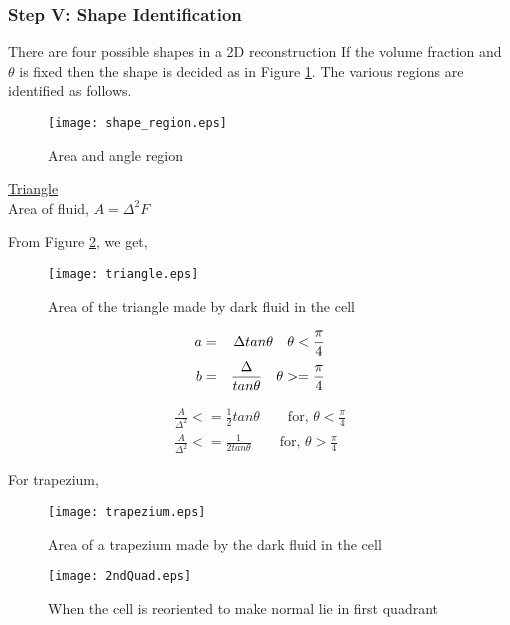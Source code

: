 \subsubsection{Step V: Shape Identification}
There are four possible shapes in a 2D reconstruction 
If the volume fraction and $\theta$ is fixed then the shape is decided as in Figure \ref{Fig:shape_region}. The various regions are identified as follows.
\begin{figure}
 \centering
    \texttt{[image: shape\_region.eps]}
  \caption{Area and angle region}
  \label{Fig:shape_region}
\end{figure}
\underline{Triangle}\\
Area of fluid, $A=\Delta^2F$ 

From Figure \ref{Fig:triangle}, we get,

\begin{figure}%
\centering
\texttt{[image: triangle.eps]}
\caption{Area of the triangle made by dark fluid in the cell}
\label{Fig:triangle}
\end{figure}

\begin{eqnarray*}
 a&=&\Delta tan\theta \text{\quad $\theta < \frac{\pi}{4}$} \\  
 b&=&\frac{\Delta}{tan\theta} \text{\quad $\theta >= \frac{\pi}{4}$}\\
\end{eqnarray*}

\begin{equation*}
\boxed{\begin{align}
    \frac{A}{\Delta^2} <= \frac{1}{2} tan\theta \qquad \text{for, }\theta < \frac{\pi}{4} \\
    \frac{A}{\Delta^2}<=  \frac{1}{2tan\theta} \qquad \text{for, }\theta > \frac{\pi}{4}   
    \end{align}}
\end{equation*}

\underline{}{For trapezium},\\

\begin{figure}%
\centering
\texttt{[image: trapezium.eps]}
\caption{Area of a trapezium made by the dark fluid in the cell}
\end{figure}

\begin{figure}
 \centering
 \texttt{[image: 2ndQuad.eps]}
 \caption{When the cell is reoriented to make normal lie in first quadrant}
 \label{Fig:reorientation}
\end{figure}

